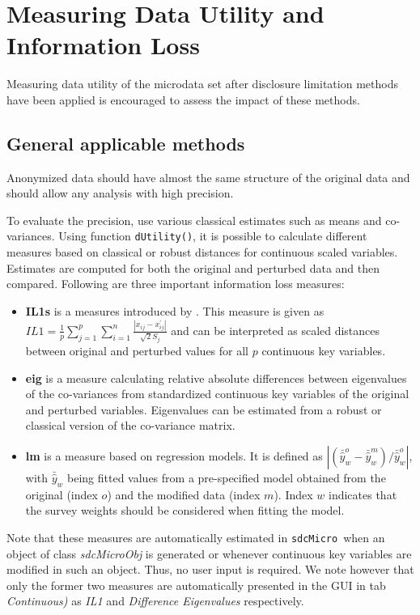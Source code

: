 \documentclass[12pt]{scrartcl}\usepackage[]{graphicx}\usepackage[]{color}
\newcommand{\sdcMicro}{\texttt{sdcMicro}}
\begin{document}
\section{Measuring Data Utility and Information Loss} \label{sub:ut}
Measuring data utility of the microdata set after disclosure limitation methods have been applied is encouraged to assess the impact of these methods.

\subsection{General applicable methods}\label{general_methods}
Anonymized data should have almost the same structure of the original data and should allow any analysis with high precision.

To evaluate the precision, use various classical estimates such as means and co-variances. Using function \lstinline{dUtility()}, it is possible to calculate different measures based on classical or robust distances for continuous scaled variables. Estimates are computed for both the original and perturbed data and then compared. Following are three important information loss measures:

\begin{itemize}
\item \textbf{IL1s} is a measures introduced by \citep{Mateo04}. This measure is given as $IL1 = \frac{1}{p} \sum\limits_{j=1}^p \sum\limits_{i=1}^n \frac{ | x_{ij} - x_{ij}^{'} | }{ \sqrt{2} S_j}$ and can be interpreted as scaled distances between original and perturbed values for all $p$ continuous key variables.
\item \textbf{eig} is a measure calculating relative absolute differences between eigenvalues of the co-variances from standardized continuous key variables of the original and perturbed variables. Eigenvalues can be estimated from a robust or classical version of the co-variance matrix.
\item \textbf{lm} is a measure based on regression models. It is defined as $|(\bar{\hat{y}}_w^o-\bar{\hat{y}}_w^m)/\bar{\hat{y}}_w^o|$, with $\bar{\hat{y}}_w$ being fitted values from a pre-specified model obtained from the original (index $o$) and the modified data (index $m$). Index $w$ indicates that the survey weights should be considered when fitting the model.
\end{itemize}

Note that these measures are automatically estimated in \sdcMicro \ when an object of class \textit{sdcMicroObj} is generated or whenever continuous key variables are modified in such an object. Thus, no user input is required. We note however that only the former two measures are automatically presented in the GUI in tab \textit{Continuous)} as \textit{IL1} and \textit{Difference Eigenvalues} respectively.
\end{document}

